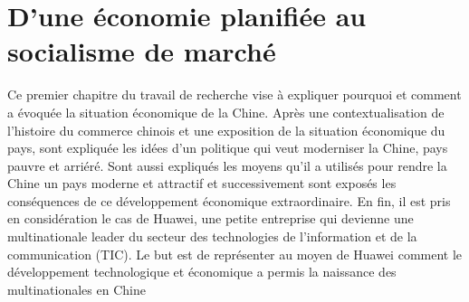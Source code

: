 \section{D’une économie planifiée au socialisme de marché}
Ce premier chapitre du travail de recherche vise à expliquer pourquoi et comment a évoquée la situation économique de la Chine. Après une contextualisation de l’histoire du commerce chinois et une exposition de la situation économique du pays, sont expliquée les idées d’un politique qui veut moderniser la Chine, pays pauvre et arriéré. Sont aussi expliqués les moyens qu’il a utilisés pour rendre la Chine un pays moderne et attractif et successivement sont exposés les conséquences de ce développement économique extraordinaire. En fin, il est pris en considération le cas de Huawei, une petite entreprise qui devienne une multinationale leader du secteur des technologies de l’information et de la communication (TIC). Le but est de représenter au moyen de Huawei comment le développement technologique et économique a permis la naissance des multinationales en Chine
